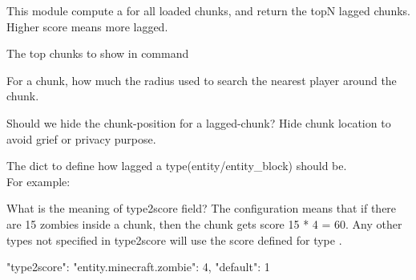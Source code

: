 This module compute a  for all loaded chunks, and return the topN lagged chunks.
Higher score means more lagged.


\begin{Configuration}
    \item[top]{
        The top chunks to show in  command
    }

    \item[nearest\_distance]{
        For a chunk, how much the radius used to search the nearest player around the chunk.
    }

    \item[hide\_location]{
        Should we hide the chunk-position for a lagged-chunk?
        Hide chunk location to avoid grief or privacy purpose.
    }

    \item[type2score]{
        The dict to define how lagged a type(entity/entity\_block) should be.\\
        For example:

        \begin{example}{What is the meaning of type2score field?}
            The configuration means that if there are 15 zombies inside a chunk, then the chunk gets score 15 * 4 = 60.
            Any other types not specified in type2score will use the score defined for type .

            \begin{jsoncode}
                "type2score": {
                    "entity.minecraft.zombie": 4,
                    "default": 1
                }
            \end{jsoncode}
        \end{example}
    }

\end{Configuration}